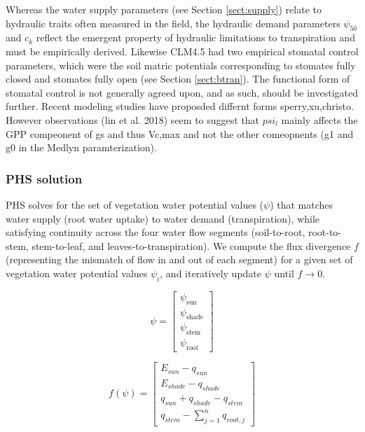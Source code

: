 \documentclass[draft,linenumbers]{agujournal}
\begin{document}
     Whereas the water supply parameters (see Section \ref{sect:supply}) relate to hydraulic traits often measured in the field, 
     the hydraulic demand parameters $\psi_{50}$ and $c_k$ reflect the emergent property of hydraulic limitations to transpiration and must be empirically derived. 
     Likewise CLM4.5 had two empirical stomatal control parameters, which were the soil matric potentials 
     corresponding to stomates fully closed and stomates fully open (see Section \ref{sect:btran}).
     The functional form of stomatal control is not generally agreed upon, and as such, should be investigated further. 
     Recent modeling studies have proposded differnt forms sperry,xu,christo. 
     However observations (lin et al. 2018) seem to suggest that $psi_l$ mainly affects the GPP compeonent of gs and thus Vc,max and not the other comeopnents (g1 and g0 in the Medlyn paramterization).

    \subsubsection{PHS solution}
    \label{sect:solution}
    
    PHS solves for the set of vegetation water potential values ($\psi$) that matches water supply
    (root water uptake) to water demand (transpiration), while satisfying continuity across the four water flow
    segments (soil-to-root, root-to-stem, stem-to-leaf, and leaves-to-transpiration). 
    We compute the flux divergence $f$ (representing the mismatch of flow in and out of each segment)
    for a given set of vegetation water potential values $\psi_i$, and iteratively update $\psi$ until $f\to0$.
    
    \begin{linenomath*}
    \begin{equation} 
    \psi = \left[
    \begin{array}{c}
    \psi_{\text{sun}} \\ 
    \psi_{\text{shade}} \\ 
    \psi_{\text{stem}} \\ 
    \psi_{\text{root}}            
    \end{array} \right]
    \end{equation}
    \end{linenomath*}
    
    \begin{linenomath*}
    \begin{equation}
    f\left(\psi\right) = \left[ 
    \begin{array}{c}
    E_{sun}-q_{sun}\\
    E_{shade}-q_{shade}\\
    q_{sun}+q_{shade}-q_{stem}\\
    q_{stem}-\sum_{j=1}^n{q_{root,j}}
    \end{array} \right]
    \end{equation}
    \end{linenomath*}
    
\end{document}
